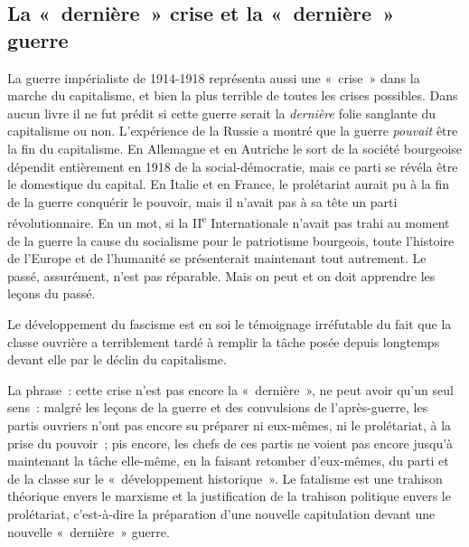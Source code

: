 \documentclass[french,twoside]{book} %
\begin{document}
\subsection[{La « dernière » crise et la « dernière » guerre}]{La « dernière » crise et la « dernière » guerre}
\noindent La guerre impérialiste de 1914-1918 représenta aussi une « crise » dans la marche du capitalisme, et bien la  plus terrible de toutes les crises possibles. Dans aucun livre il ne fut prédit si cette guerre serait la \emph{dernière} folie sanglante du capitalisme ou non. L’expérience de la Russie a montré que la guerre \emph{pouvait} être la fin du capitalisme. En Allemagne et en Autriche le sort de la société bourgeoise dépendit entièrement en 1918 de la social-démocratie, mais ce parti se révéla être le domestique du capital. En Italie et en France, le prolétariat aurait pu à la fin de la guerre conquérir le pouvoir, mais il n’avait pas à sa tête un parti révolutionnaire. En un mot, si la II\textsuperscript{e} Internationale n’avait pas trahi au moment de la guerre la cause du socialisme pour le patriotisme bourgeois, toute l’histoire de l’Europe et de l’humanité se présenterait maintenant tout autrement. Le passé, assurément, n’est pas réparable. Mais on peut et on doit apprendre les leçons du passé.\par
Le développement du fascisme est en soi le témoignage irréfutable du fait que la classe ouvrière a terriblement tardé à remplir la tâche posée depuis longtemps devant elle par le déclin du capitalisme.\par
La phrase : cette crise n’est pas encore la « dernière », ne peut avoir qu’un seul sens : malgré les leçons de la guerre et des convulsions de l’après-guerre, les partis ouvriers n’ont pas encore su préparer ni eux-mêmes, ni le prolétariat, à la prise du pouvoir ; pis encore, les chefs de ces partis ne voient pas encore jusqu’à maintenant la tâche elle-même, en la faisant retomber d’eux-mêmes, du parti et de la classe sur le « développement historique ». Le fatalisme est une trahison théorique envers le marxisme et la justification de la trahison politique envers le prolétariat, c’est-à-dire la préparation d’une nouvelle capitulation devant une nouvelle « dernière » guerre.
\end{document}
